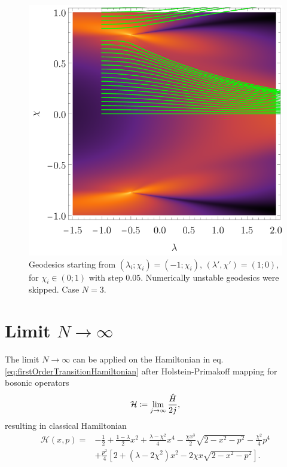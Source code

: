 \begin{figure}[h]
    \centering
    \includegraphics{../img/N=3_geodesics_lambdaIn=-1.pdf}
    \caption{Geodesics starting from $(\lambda_i;\chi_i)=(-1;\chi_i)$, $(\lambda',\chi')=(1;0)$, for $\chi_i\in(0;1)$ with step $0.05$. Numerically unstable geodesics were skipped. Case $N=3$.}
    \label{fig:N=3_geodesics_lambdaIn=-1}    
\end{figure}



\newpage
\section{Limit $N\rightarrow \infty$}
The limit $N\rightarrow \infty$ can be applied on the Hamiltonian in eq. \ref{eq:firstOrderTransitionHamiltonian} after Holstein-Primakoff mapping for bosonic operators
\begin{equation}
    \mathcal{H}\coloneqq\lim_{j\rightarrow\infty}\frac{\hat{H}}{2j},
\end{equation}
resulting in classical Hamiltonian
\begin{equation}
    \begin{split}
        \mathcal{H}(x,p)=&-\frac{1}{2}+\frac{1-\lambda}{2}x^2+\frac{\lambda-\chi^2}{4}x^4-\frac{\chi x^3}{2}\sqrt{2-x^2-p^2}-\frac{\chi^2}{4}p^4\\
        &+\frac{p^2}{4}\left[2+(\lambda-2\chi^2)x^2-2\chi x\sqrt{2-x^2-p^2}\right].
    \end{split}
    \label{eq:HamiltonianClassicalLimit}
\end{equation}




